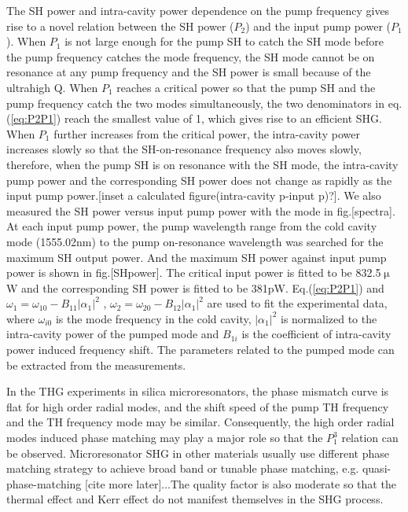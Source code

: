 \documentclass[a4paper,12pt,hyperref]{article}
\begin{document}
The SH power and intra-cavity power dependence on the pump frequency gives rise to a novel relation between the SH power ($P_2$) and the input pump power ($P_1$). When $P_1$ is not large enough for the pump SH to catch the SH mode before the pump frequency catches the mode frequency, the SH mode cannot be on resonance at any pump frequency and the SH power is small because of the ultrahigh Q. When $P_1$ reaches a critical power so that the pump SH and the pump frequency catch the two modes simultaneously, the two denominators in eq.(\ref{eq:P2P1}) reach the smallest value of 1, which gives rise to an efficient SHG. When $P_1$ further increases from the critical power, the intra-cavity power increases slowly so that the SH-on-resonance frequency also moves slowly, therefore, when the pump SH is on resonance with the SH mode, the intra-cavity pump power and the corresponding SH power does not change as rapidly as the input pump power.[inset a calculated figure(intra-cavity p-input p)?]. We also measured the SH power versus input pump power with the mode in fig.[spectra]. At each input pump power, the pump wavelength range from the cold cavity mode (1555.02nm) to the pump on-resonance wavelength was searched for the maximum SH output power. And the maximum SH power against input pump power is shown in fig.[SHpower]. The critical input power is fitted to be 832.5$\upmu$W and the corresponding SH power is fitted to be 381pW. Eq.(\ref{eq:P2P1}) and $\omega_1 = \omega_{10}-B_{11}|\alpha_1|^2$ \cite{carmon2004dynamical}, $\omega_2 = \omega_{20}-B_{12}|\alpha_1|^2$ are used to fit the experimental data, where $\omega_{i0}$ is the mode frequency in the cold cavity, $|\alpha_1|^2$ is normalized to the intra-cavity power of the pumped mode and $B_{1i}$ is the coefficient of intra-cavity power induced frequency shift. The parameters related to the pumped mode can be extracted from the measurements. 

In the THG experiments in silica microresonators\cite{carmon2007visible, farnesi2014optical}, the phase mismatch curve is flat for high order radial modes, and the shift speed of the pump TH frequency and the TH frequency mode may be similar. Consequently, the high order radial modes induced phase matching may play a major role so that the $P_1^3$ relation can be observed. Microresonator SHG in other materials usually use different phase matching strategy to achieve broad band or tunable phase matching, e.g. quasi-phase-matching [cite more later]...The quality factor is also moderate so that the thermal effect and Kerr effect do not manifest themselves in the SHG process.
\end{document}
